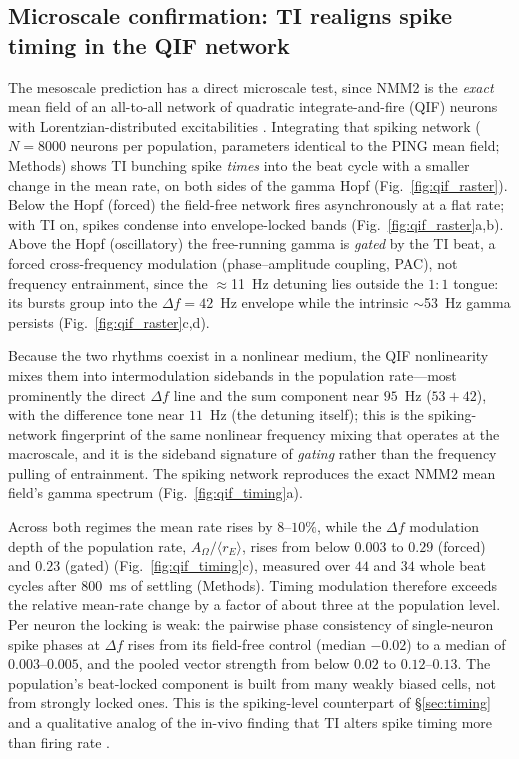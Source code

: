 \documentclass[11pt,a4paper]{article}
\providecommand{\DIFaddbegin}{} %
\providecommand{\DIFaddend}{} %
\begin{document}
\subsection{Microscale confirmation: TI realigns spike timing in the QIF network}\label{sec:qif}
The mesoscale prediction has a direct microscale test, since NMM2 is the \emph{exact} mean
field of an all-to-all network of quadratic integrate-and-fire (QIF) neurons with
Lorentzian-distributed excitabilities
\cite{montbrio2015,ruffini2025rosetta,clusella2023}. Integrating that spiking network
($N=8000$ neurons per population, parameters identical to the PING mean field; Methods)
shows TI bunching spike \emph{times} into the beat cycle with a smaller change in the mean
rate, on both sides of the gamma Hopf (Fig.~\ref{fig:qif_raster}). Below the Hopf (forced)
the field-free network fires asynchronously at a flat rate; with TI on, spikes condense
into envelope-locked bands (Fig.~\ref{fig:qif_raster}a,b). Above the Hopf (oscillatory) the
free-running gamma is \emph{gated} by the TI beat, a forced cross-frequency modulation
(phase--amplitude coupling, PAC), not frequency entrainment, since the $\approx$11~Hz detuning lies outside the
$1{:}1$ tongue: its bursts group into the $\Delta f=42$~Hz envelope while the intrinsic
$\sim$53~Hz gamma persists (Fig.~\ref{fig:qif_raster}c,d).
\DIFaddbegin 

\DIFaddend Because the two rhythms coexist
in a nonlinear medium, the QIF nonlinearity mixes them into intermodulation sidebands in
the population rate---most prominently the direct $\Delta f$ line and the sum component near
$95$~Hz ($53\!+\!42$), with the difference tone near $11$~Hz (the detuning itself); this is
the spiking-network fingerprint of the same nonlinear frequency mixing that operates at the
macroscale, and it is the sideband signature of \emph{gating} rather than the frequency
pulling of entrainment. The spiking network reproduces
the exact NMM2 mean field's gamma spectrum (Fig.~\ref{fig:qif_timing}a).
\DIFaddbegin 

\DIFaddend Across both regimes the mean rate rises by $8$--$10\%$, while the $\Delta f$ modulation depth of the
population rate, $A_\Omega/\langle r_E\rangle$, rises from below $0.003$ to $0.29$ (forced)
and $0.23$ (gated) (Fig.~\ref{fig:qif_timing}c), measured over $44$ and $34$ whole beat
cycles after $800$~ms of settling (Methods). Timing modulation therefore exceeds the
relative mean-rate change by a factor of about three at the population level. Per neuron
the locking is weak: the pairwise phase consistency of single-neuron spike phases at
$\Delta f$ rises from its field-free control (median $-0.02$) to a median of
$0.003$--$0.005$, and the pooled vector strength from below $0.02$ to $0.12$--$0.13$. The
population's beat-locked component is built from many weakly biased cells, not from
strongly locked ones. This is the spiking-level counterpart of \S\ref{sec:timing} and a
qualitative analog of the in-vivo finding that TI alters spike timing more than firing
rate \cite{vieira2024}.
\end{document}

